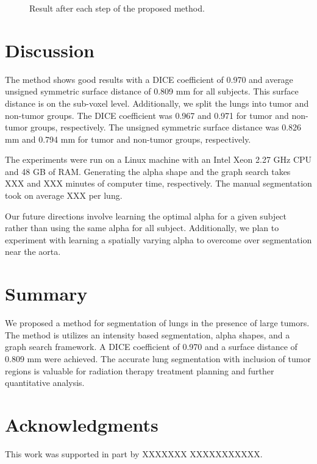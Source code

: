 \documentclass{llncs}
\begin{document}
\begin{figure}[t]
  \centering
  \caption{Result after each step of the proposed method.}
  \label{fig:steps}
\end{figure}
\fi





%
\section{Discussion}
%

The method shows good results with a DICE coefficient of 0.970 and average unsigned symmetric surface distance of 0.809 mm for all subjects. This surface distance is on the sub-voxel level. Additionally, we split the lungs into tumor and non-tumor groups. The DICE coefficient was 0.967 and 0.971 for tumor and non-tumor groups, respectively. The unsigned symmetric surface distance was 0.826 mm and 0.794 mm for tumor and non-tumor groups, respectively.

The experiments were run on a Linux machine with an Intel Xeon 2.27 GHz CPU and 48 GB of RAM. Generating the alpha shape and the graph search takes XXX and XXX minutes of computer time, respectively. The manual segmentation took on average XXX per lung.

Our future directions involve learning the optimal alpha for a given subject rather than using the same alpha for all subject. Additionally, we plan to experiment with learning a spatially varying alpha to overcome over segmentation near the aorta.
%
\section{Summary}
%
We proposed a method for segmentation of lungs in the presence of large tumors. The method is utilizes an intensity based segmentation, alpha shapes, and a graph search framework. A DICE coefficient of 0.970 and a surface distance of 0.809 mm were achieved. The accurate lung segmentation with  inclusion of tumor regions is valuable for radiation therapy treatment planning and further quantitative analysis.
%
\section{Acknowledgments}
%
This work was supported in part by 
XXXXXXX XXXXXXXXXXX.


%
%









\clearpage
{} %
\renewcommand{\indexname}{Author Index}
\printindex
\clearpage

\end{document}
